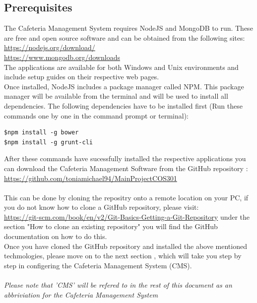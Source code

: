 \documentclass[a4paper,12pt]{article}
\begin{document}
\subsection{Prerequisites}
The Cafeteria Management System requires NodeJS and MongoDB to run. These are free and open source software and can be obtained from the following sites:\\
\url{https://nodejs.org/download/} \\
\url{https://www.mongodb.org/downloads} \\
The applications are available for both Windows and Unix environments and include setup guides on their respective web pages.\\

Once installed, NodeJS includes a package manager called NPM. This package manager will be available from the terminal and will be used to install all dependencies. The following dependencies have to be installed first (Run these commands one by one in the command prompt or terminal):
\begin{verbatim}
$npm install -g bower
$npm install -g grunt-cli
\end{verbatim}

After these commands have sucessfully installed the respective applications you can download the Cafeteria Management Software from the GitHub repository :
 \url{https://github.com/toniamichael94/MainProjectCOS301}
\\ \\
This can be done by cloning the repositry onto a remote location on your PC, if you do not know how to clone a GitHub repository, please visit:\\
  \url{https://git-scm.com/book/en/v2/Git-Basics-Getting-a-Git-Repository}  under the section "How to clone an existing repository" you will find the GitHub documentation on how to do this.
\\
Once you have cloned the GitHub repository and installed the above mentioned techmologies, please move on to the next section , which will take you step by step in configering the Cafeteria Management System (CMS).
\\ \\
{\em Please note that 'CMS' will be refered to in the rest of this document as an abbriviation for the Cafeteria Management System}


\end{document}
